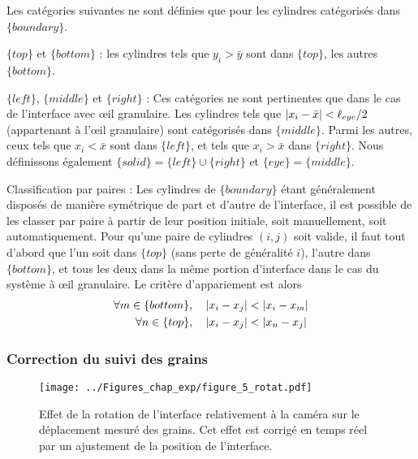 Les catégories suivantes ne sont définies que pour les cylindres catégorisés dans $\{boundary\}$.

\begin{itemize}
\bitem $\{top\}$ et $\{bottom\}$ : les cylindres tels que $y_i>\bar{y}$ sont dans $\{top\}$, les autres $\{bottom\}$.

\bitem $\{left\}$, $\{middle\}$ et $\{right\}$ : Ces catégories ne sont pertinentes que dans le cas de l'interface avec œil granulaire. Les cylindres tels que $\left| x_i-\bar{x} \right|<\ell_{eye}/2$ (appartenant à l'œil granulaire) sont catégorisés dans $\{middle\}$. Parmi les autres, ceux tels que $x_i<\bar{x}$ sont dans $\{left\}$, et tels que $x_i>\bar{x}$ dans $\{right\}$. Nous définissons également $\{solid\}=\{left\}\cup\{right\}$ et $\{eye\}=\{middle\}$.

\bitem Classification par paires : Les cylindres de $\{boundary\}$ étant généralement disposés de manière symétrique de part et d'autre de l'interface, il est possible de les classer par paire à partir de leur position initiale, soit manuellement, soit automatiquement. Pour qu'une paire de cylindres $(i,j)$ soit valide, il faut tout d'abord que l'un soit dans $\{top\}$ (sans perte de généralité $i$), l'autre dans $\{bottom\}$, et tous les deux dans la même portion d'interface dans le cas du système à œil granulaire. Le critère d'appariement est alors
\nopagebreak[4]
\begin{align}[left=\empheqlbrace]
\begin{split}
\forall m  \in\{bottom\},&\quad\abs{x_i-x_j}<\abs{x_i-x_m}\\
\forall n  \in\{top\},&\quad\abs{x_i-x_j}<\abs{x_n-x_j}
\end{split}
\end{align}

\end{itemize}





\subsubsection{Correction du suivi des grains}
\label{sec:rotat}

\begin{figure}[htb]
\centering
\texttt{[image: ../Figures\_chap\_exp/figure\_5\_rotat.pdf]}
\caption[Correction de la rotation de l'interface]{Effet de la rotation de l'interface relativement à la caméra sur le déplacement mesuré des grains. Cet effet est corrigé en temps réel par un ajustement de la position de l'interface.}
\label{fig:rotat}
\end{figure}

